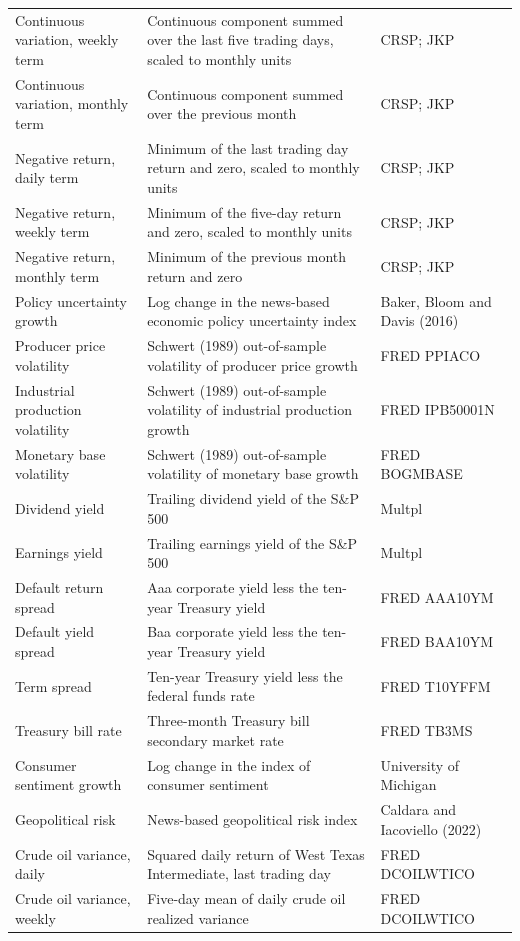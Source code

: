 {\begin{longtable}{>{\raggedright\arraybackslash}m{3.3cm}>{\raggedright\arraybackslash}m{6.2cm}>{\raggedright\arraybackslash}m{2.9cm}}
Continuous variation, weekly term & Continuous component summed over the last five trading days, scaled to monthly units & CRSP; JKP \\
Continuous variation, monthly term & Continuous component summed over the previous month & CRSP; JKP \\
Negative return, daily term & Minimum of the last trading day return and zero, scaled to monthly units & CRSP; JKP \\
Negative return, weekly term & Minimum of the five-day return and zero, scaled to monthly units & CRSP; JKP \\
Negative return, monthly term & Minimum of the previous month return and zero & CRSP; JKP \\
Policy uncertainty growth & Log change in the news-based economic policy uncertainty index & Baker, Bloom and Davis (2016) \\
Producer price volatility & Schwert (1989) out-of-sample volatility of producer price growth & FRED PPIACO \\
Industrial production volatility & Schwert (1989) out-of-sample volatility of industrial production growth & FRED IPB50001N \\
Monetary base volatility & Schwert (1989) out-of-sample volatility of monetary base growth & FRED BOGMBASE \\
Dividend yield & Trailing dividend yield of the S\&P 500 & Multpl \\
Earnings yield & Trailing earnings yield of the S\&P 500 & Multpl \\
Default return spread & Aaa corporate yield less the ten-year Treasury yield & FRED AAA10YM \\
Default yield spread & Baa corporate yield less the ten-year Treasury yield & FRED BAA10YM \\
Term spread & Ten-year Treasury yield less the federal funds rate & FRED T10YFFM \\
Treasury bill rate & Three-month Treasury bill secondary market rate & FRED TB3MS \\
Consumer sentiment growth & Log change in the index of consumer sentiment & University of Michigan \\
Geopolitical risk & News-based geopolitical risk index & Caldara and Iacoviello (2022) \\
Crude oil variance, daily & Squared daily return of West Texas Intermediate, last trading day & FRED DCOILWTICO \\
Crude oil variance, weekly & Five-day mean of daily crude oil realized variance & FRED DCOILWTICO \\

\end{longtable}}
